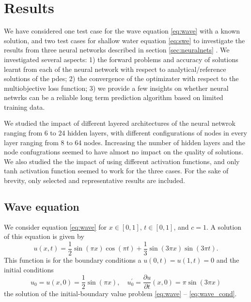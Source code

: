 \section{Results}
\label{sec:results}
We have considered one test case for the wave equation \ref{eq:wave} with a known solution, and two test cases for shallow water equation \ref{eq:swe} to investigate the results from three neural networks described in section \ref{sec:neuralnets} . We investigated several aspects: 1) the  forward problems and accuracy of solutions learnt from each of the neural network with respect to analytical/reference solutions of the pdes; 2) the convergence of the optimizater with respect to the multiobjective loss function; 3)  we provide a few insights on whether neural netwrks can be a reliable long term prediction algorithm based on limited training data. 
\par
We studied the impact of different layered architectures of the neural netwrok ranging from 6 to 24 hidden layers, with different configurations of nodes in every layer ranging from 8 to 64 nodes. Increasing the number of hidden layers and the node confugrations seemed to have almost no impact on the quality of solutions. We also studied the the impact of using different activation functions, and only tanh activation function seemed to work for the three cases. For the sake of brevity, only selected and representative results are included. 

\subsection{Wave equation}
\label{subsec:wave_res}
We consider equation \eqref{eq:wave} for $x \in [0,1]$, $t \in [0,1]$, and $c =1$.  A solution of this 
equation is given by 
\[
u(x,t) = \frac{1}{2} \sin (\pi x) \cos(\pi t) + \frac{1}{3} \sin (3\pi x) \sin (3 \pi t).  
\]
This function is for the boundary conditions a $u(0,t) = u(1,t) =  0$ and the initial 
conditions 
\[
u_0  = u(x,0)  = \frac{1}{2} \sin (\pi x), \quad u_0^{\prime}=\frac{\partial u}{\partial t}(x,0) = \pi  \sin (3 \pi x)
\]
the solution of the initial-boundary value problem \eqref{eq:wave} -- \eqref{eq:wave_cond}.

